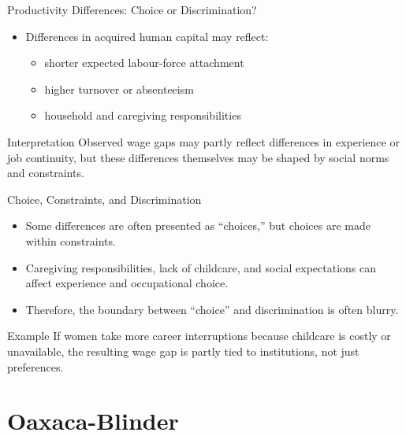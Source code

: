 \documentclass[aspectratio=169]{beamer}
\begin{document}
\begin{frame}{Productivity Differences: Choice or Discrimination?}
\transfade
\begin{itemize}[<+->]
  \item Differences in acquired human capital may reflect:
  \begin{itemize}[<+->]
    \item shorter expected labour-force attachment
    \item higher turnover or absenteeism
    \item household and caregiving responsibilities
  \end{itemize}
\end{itemize}

\begin{block}{Interpretation}
Observed wage gaps may partly reflect differences in experience or job continuity, but these differences themselves may be shaped by social norms and constraints.
\end{block}
\end{frame}

\begin{frame}{Choice, Constraints, and Discrimination}
\transfade
\begin{itemize}[<+->]
  \item Some differences are often presented as ``choices,'' but choices are made within constraints.
  \item Caregiving responsibilities, lack of childcare, and social expectations can affect experience and occupational choice.
  \item Therefore, the boundary between ``choice'' and discrimination is often blurry.
\end{itemize}

\begin{exampleblock}{Example}
If women take more career interruptions because childcare is costly or unavailable, the resulting wage gap is partly tied to institutions, not just preferences.
\end{exampleblock}
\end{frame}

\section{Oaxaca-Blinder}
\end{document}
